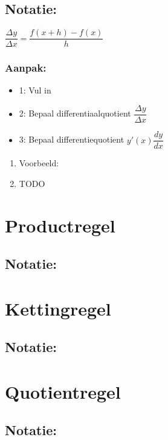 \documentclass[11pt]{article}
\begin{document}
\subsection{Notatie:}
\label{sec:org546f159}
\(\dfrac{\Delta y}{\Delta x} = \dfrac{f(x+h) - f(x)}{h}\)
\subsubsection{Aanpak:}
\label{sec:org1c113fc}
\begin{itemize}
\item 1: Vul in
\item 2: Bepaal differentiaalquotient \(\dfrac{\Delta y}{\Delta x}\)
\item 3: Bepaal differentiequotient \(y'(x) \dfrac{dy}{dx}\)
\end{itemize}
\begin{enumerate}
\item Voorbeeld:
\label{sec:orgb4b4b4a}
\item TODO
\label{sec:orgc26817c}
\end{enumerate}


\section{Productregel}
\label{sec:orgdfb2cb6}
\subsection{Notatie:}
\label{sec:org70b9fad}


\section{Kettingregel}
\label{sec:orgbb6d7f7}
\subsection{Notatie:}
\label{sec:org2b355b6}

\section{Quotientregel}
\label{sec:org0d8cc43}
\subsection{Notatie:}
\label{sec:orgc850906}
\end{document}
